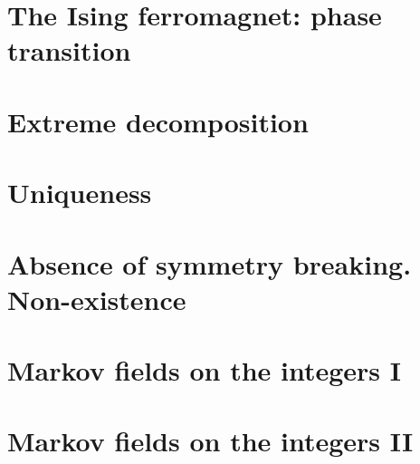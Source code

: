 \chapter{The Ising ferromagnet: phase transition}





\chapter{Extreme decomposition}





\chapter{Uniqueness}




\chapter{Absence of symmetry breaking. Non-existence}




\chapter{Markov fields on the integers I}





\chapter{Markov fields on the integers II}






